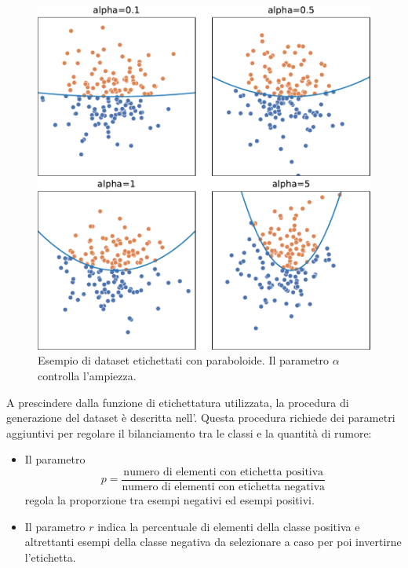 \begin{figure}
    \centering
    \includegraphics[width=.5\linewidth]{img/pacman_dataset_param_influence.pdf}
    \caption{Esempio di dataset etichettati con paraboloide. Il parametro $\alpha$ controlla l'ampiezza.}
    \label{fig:pacman_dataset}
\end{figure}
A prescindere dalla funzione di etichettatura utilizzata, la procedura di generazione del dataset è descritta nell'.
Questa procedura richiede dei parametri aggiuntivi per regolare il bilanciamento tra le classi e la quantità di rumore:
\begin{itemize}
    \item Il parametro 
    \begin{equation*}
        p = \frac{\text{numero di elementi con etichetta positiva}}{\text{numero di elementi con etichetta negativa}}
    \end{equation*} 
    regola la proporzione tra esempi negativi ed esempi positivi.
    \item Il parametro $r$ indica la percentuale di elementi della classe positiva e altrettanti esempi della classe negativa da selezionare a caso per poi invertirne l'etichetta.
\end{itemize}
